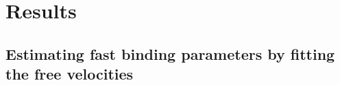 


\section{Results}
\label{sec:results-jump-velocity}

\subsection{Estimating fast binding parameters by fitting the free
  velocities}
\label{sec:estim-fast-bind}


